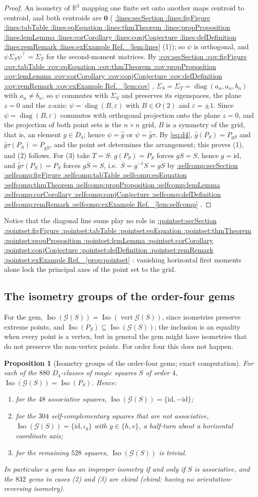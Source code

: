\documentclass[11pt,a4paper]{article}
\makeatletter
\def\Cref@getprefix#1:#2\relax{#1}
\def\Cref@prefix@sec{sec}
\def\Cref@prefix@fig{fig}
\def\Cref@prefix@tab{tab}
\def\Cref@prefix@eq{eq}
\def\Cref@prefix@thm{thm}
\def\Cref@prefix@prop{prop}
\def\Cref@prefix@lem{lem}
\def\Cref@prefix@cor{cor}
\def\Cref@prefix@conj{conj}
\def\Cref@prefix@def{def}
\def\Cref@prefix@rem{rem}
\def\Cref@prefix@ex{ex}
\def\Cref@type@cap#1{%
  \edef\Cref@tmp{#1}%
  \ifx\Cref@tmp\Cref@prefix@sec Section%
  \else\ifx\Cref@tmp\Cref@prefix@fig Figure%
  \else\ifx\Cref@tmp\Cref@prefix@tab Table%
  \else\ifx\Cref@tmp\Cref@prefix@eq Equation%
  \else\ifx\Cref@tmp\Cref@prefix@thm Theorem%
  \else\ifx\Cref@tmp\Cref@prefix@prop Proposition%
  \else\ifx\Cref@tmp\Cref@prefix@lem Lemma%
  \else\ifx\Cref@tmp\Cref@prefix@cor Corollary%
  \else\ifx\Cref@tmp\Cref@prefix@conj Conjecture%
  \else\ifx\Cref@tmp\Cref@prefix@def Definition%
  \else\ifx\Cref@tmp\Cref@prefix@rem Remark%
  \else\ifx\Cref@tmp\Cref@prefix@ex Example%
  \else Ref.%
  \fi\fi\fi\fi\fi\fi\fi\fi\fi\fi\fi\fi
}
\DeclareRobustCommand{\Cref}[1]{%
  \begingroup
  \edef\Cref@label{#1}%
  \edef\Cref@prefix{\expandafter\Cref@getprefix\Cref@label:\relax}%
  \hyperref[#1]{\Cref@type@cap{\Cref@prefix}~\ref*{#1}}%
  \endgroup
}
\theoremstyle{plain}
\newtheorem{proposition}[theorem]{Proposition}
\theoremstyle{definition}
\theoremstyle{remark}
\newcommand{\R}{\mathbb{R}}
\makeatother
\begin{document}
\begin{proof}
An isometry of $\R^3$ mapping one finite set onto another maps centroid to centroid, and both centroids are $\mathbf 0$ (\Cref{lem:lines}(1)); so $\psi$ is orthogonal, and $\psi\Sigma_S\psi^{\top}=\Sigma_T$ for the second-moment matrices.
By \Cref{lem:cov}, $\Sigma_S=\Sigma_T=\operatorname{diag}(a_n,a_n,b_n)$ with $a_n\neq b_n$, so $\psi$ commutes with $\Sigma_S$ and preserves its eigenspaces, the plane $z=0$ and the $z$-axis: $\psi=\operatorname{diag}(B,\varepsilon)$ with $B\in O(2)$ and $\varepsilon=\pm1$.
Since $\psi=\operatorname{diag}(B,\varepsilon)$ commutes with orthogonal projection onto the plane $z=0$, and the projection of both point sets is the $n\times n$ grid, $B$ is a symmetry of the grid, that is, an element $g\in D_4$; hence $\psi=\hat g$ or $\psi=\hat g\tau$.
By \eqref{eq:d4}, $\hat g(P_S)=P_{gS}$ and $\hat g\tau(P_S)=P_{g\overline S}$, and the point set determines the arrangement; this proves (1), and (2) follows.
For (3) take $T=S$: $\hat g(P_S)=P_S$ forces $gS=S$, hence $g=\mathrm{id}$, and $\hat g\tau(P_S)=P_S$ forces $g\overline S=S$, i.e.\ $\overline S=g^{-1}S=gS$ by \Cref{lem:selfcomp}.
\end{proof}

Notice that the diagonal line sums play no role in \Cref{prop:pointset}: vanishing horizontal first moments alone lock the principal axes of the point set to the grid.

\subsection{The isometry groups of the order-four gems}
\label{sec:iso4}

For the gem, $\operatorname{Iso}(\mathcal G(S))=\operatorname{Iso}(\operatorname{vert}\mathcal G(S))$, since isometries preserve extreme points, and $\operatorname{Iso}(P_S)\subseteq\operatorname{Iso}(\mathcal G(S))$; the inclusion is an equality when every point is a vertex, but in general the gem might have isometries that do not preserve the non-vertex points.
For order four this does not happen.

\begin{proposition}[Isometry groups of the order-four gems; exact computation]
\label{prop:iso4}
For each of the $880$ $D_4$-classes of magic squares $S$ of order $4$, $\operatorname{Iso}(\mathcal G(S))=\operatorname{Iso}(P_S)$. Hence:
\begin{enumerate}
\item for the $48$ associative squares, $\operatorname{Iso}(\mathcal G(S))=\{\mathrm{id},-\mathrm{id}\}$;
\item for the $304$ self-complementary squares that are not associative, $\operatorname{Iso}(\mathcal G(S))=\{\mathrm{id},\iota_g\}$ with $g\in\{h,v\}$, a half-turn about a horizontal coordinate axis;
\item for the remaining $528$ squares, $\operatorname{Iso}(\mathcal G(S))$ is trivial.
\end{enumerate}
In particular a gem has an improper isometry if and only if $S$ is associative, and the $832$ gems in cases (2) and (3) are chiral (chiral: having no orientation-reversing isometry).
\end{proposition}
\end{document}
